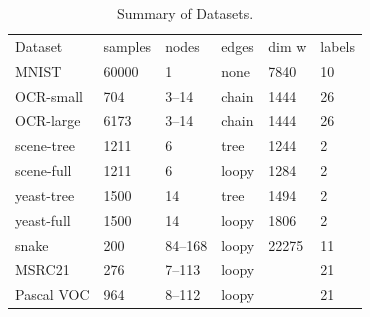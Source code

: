 \begin{table}
    \caption{Summary of Datasets.}
    \begin{tabu} to 
    \toprule
    Dataset    & samples & nodes & edges & dim w & labels\\
    MNIST      & 60000   & 1     & none  & 7840  & 10\\
    OCR-small  & 704     & 3--14 & chain & 1444  & 26\\
    OCR-large  & 6173    & 3--14 & chain & 1444  & 26\\
    scene-tree & 1211    & 6     & tree  & 1244  & 2\\
    scene-full & 1211    & 6     & loopy & 1284  & 2\\
    yeast-tree & 1500    & 14    & tree  & 1494  & 2\\
    yeast-full & 1500    & 14    & loopy & 1806  & 2\\
    snake      & 200     &84--168& loopy & 22275 & 11\\
    MSRC21     & 276     & 7--113& loopy &       & 21\\
    Pascal VOC & 964     & 8--112& loopy &       & 21\\
    \bottomrule

    \end{tabu}
\end{table}

